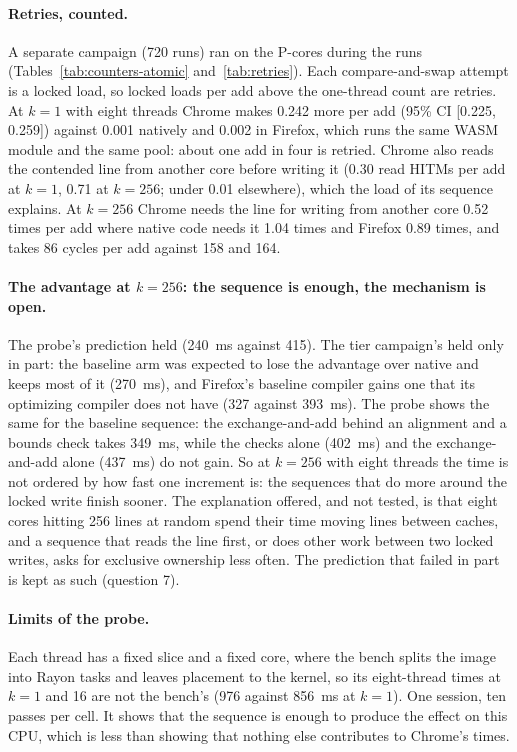 \paragraph{Retries, counted.} A separate campaign (720 runs) ran
 on the P-cores during the runs
(Tables~\ref{tab:counters-atomic} and~\ref{tab:retries}). Each
compare-and-swap attempt is a locked load, so locked loads per add above
the one-thread count are retries. At $k=1$ with eight threads Chrome makes
0.242 more per add (95\% CI [0.225, 0.259]) against 0.001 natively and
0.002 in Firefox, which runs the same WASM module and the same pool: about
one add in four is retried. Chrome also reads the contended line from
another core before writing it (0.30 read HITMs per add at $k=1$, 0.71 at
$k=256$; under 0.01 elsewhere), which the load of its sequence explains.
At $k=256$ Chrome needs the line for writing from another core 0.52 times
per add where native code needs it 1.04 times and Firefox 0.89 times, and
takes 86 cycles per add against 158 and 164.




\paragraph{The advantage at $k=256$: the sequence is enough, the mechanism
is open.} The probe's prediction held (240~ms against 415). The tier
campaign's held only in part: the baseline arm was expected to lose the
advantage over native and keeps most of it (270~ms), and Firefox's baseline
compiler gains one that its optimizing compiler does not have (327 against
393~ms). The probe shows the same for the baseline sequence: the
exchange-and-add behind an alignment and a bounds check takes 349~ms, while
the checks alone (402~ms) and the exchange-and-add alone (437~ms) do not
gain. So at $k=256$ with eight threads the time is not ordered by how fast
one increment is: the sequences that do more around the locked write finish
sooner. The explanation offered, and not tested, is that eight cores
hitting 256 lines at random spend their time moving lines between caches,
and a sequence that reads the line first, or does other work between two
locked writes, asks for exclusive ownership less often. The prediction that
failed in part is kept as such (question 7).

\paragraph{Limits of the probe.} Each thread has a fixed slice and a fixed
core, where the bench splits the image into Rayon tasks and leaves
placement to the kernel, so its eight-thread times at $k=1$ and 16 are not
the bench's (976 against 856~ms at $k=1$). One session, ten passes per
cell. It shows that the sequence is enough to produce the effect on this
CPU, which is less than showing that nothing else contributes to Chrome's
times.

